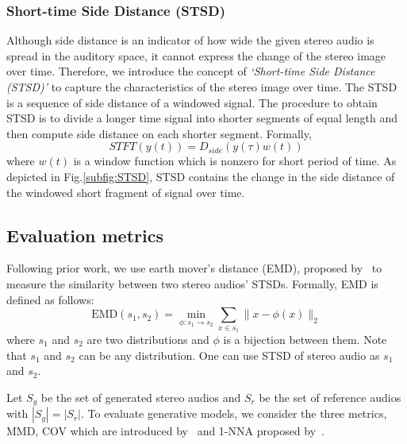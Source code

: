 \subsubsection{Short-time Side Distance (STSD)}
\label{subsubsec:stsd}
Although side distance is an indicator of how wide the given stereo audio is spread in the auditory space, it cannot express the change of the stereo image over time. Therefore, we introduce the concept of \textit{`Short-time Side Distance (STSD)'} to capture the characteristics of the stereo image over time. The STSD is a sequence of side distance of a windowed signal. The procedure to obtain STSD is to divide a longer time signal into shorter segments of equal length and then compute side distance on each shorter segment. Formally,
\begin{equation}
    STFT(y(t)) = D_{side}(y(\tau)w(t))
\end{equation}
where $w(t)$ is a window function which is nonzero for short period of time. As depicted in Fig.\ref{subfig:STSD}, STSD contains the change in the side distance of the windowed short fragment of signal over time.
\subsection{Evaluation metrics}
\label{subsec:metric}
Following prior work, we use earth mover's distance (EMD), proposed by~\cite{emd} to measure the similarity between two stereo audios' STSDs. Formally, EMD is defined as follows:
\begin{equation}
    \text{EMD}(s_1, s_2) = \min_{\phi: s_1\to s_2} \sum_{x\in s_1} \|x-\phi(x)\|_2 \nonumber
\end{equation}
where $s_1$ and $s_2$ are two distributions and $\phi$ is a bijection between them. Note that $s_1$ and $s_2$ can be any distribution. One can use STSD of stereo audio as $s_1$ and $s_2$.

Let $S_g$ be the set of generated stereo audios and $S_r$ be the set of reference audios with $|S_g| = |S_r|$. To evaluate generative models, we consider the three metrics, MMD, COV which are introduced by~\cite{achlioptas} and 1-NNA proposed by~\cite{1-nna}.

